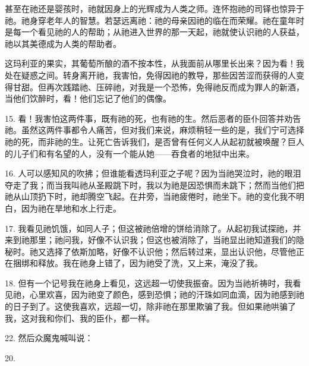 甚至在祂还是婴孩时，祂就因身上的光辉成为人类之师。连怀抱祂的司铎也惊异于祂。祂身穿老年人的智慧。若瑟远离祂：祂的母亲因祂的临在而荣耀。祂在童年时是每一个看见祂的人的帮助；从祂进入世界的那一天起，祂就使认识祂的人获益，祂以其美德成为人类的帮助者。\par

这玛利亚的果实，其葡萄所酿的酒不按本性，从我面前从哪里长出来？因为看！我处在疑惑之间。转身离开祂，我害怕，免得因祂的教导，那些因苦涩而获得的人变得甘甜。但再次践踏祂、压碎祂，对我是一个恐怖，免得祂反而成为罪人的新酒，当他们饮醉时，看！他们忘记了他们的偶像。\par

15. 看！我害怕这两件事，既有祂的死，也有祂的生。然后恶者的臣仆回答并劝告祂。虽然这两件事都令人痛苦，但对我们来说，麻烦稍轻一些的是，我们宁可选择祂的死，而非祂的生。让死亡告诉我们，是否曾有任何义人从起初就被唤醒？巨人的儿子们和有名望的人，没有一个能从她——吞食者的地狱中出来。\par

16. 人可以感知风的吹拂；但谁能看透玛利亚之子呢？因为当祂哭泣时，祂的眼泪夺走了我；而当我叫祂从圣殿跳下时，我以为祂是因恐惧而未跳下；然而当他们把祂从山顶扔下时，祂却腾空飞起。在井旁，当祂疲倦时，祂坐下。祂的变化我不明白，因为祂在旱地和水上行走。\par

17. 我看见祂饥饿，如同人子；但这被祂倍增的饼给消除了。从起初我试探祂，并来到祂那里；祂问我，好像不认识我；但这也被消除了，当祂显出祂知道我们的隐秘时。祂又选择了依斯加略，好像不认识他；然后转过来，显出认识他，尽管他正在捆绑和释放。我在祂身上错了，因为祂受了洗，又上来，淹没了我。\par

18. 但有一个记号我在祂身上看见，这远超一切使我振奋。因为当祂祈祷时，我看见祂，心里欢喜，因为祂变了颜色，感到恐惧；祂的汗珠如同血滴，因为祂感到祂的日子到了。这使我喜欢，远超一切，除非祂在那里欺骗了我。但如果祂哄骗了我，这对我和你们、我的臣仆，都一样。\par

22. 然后众魔鬼喊叫说：\par

20. \par

